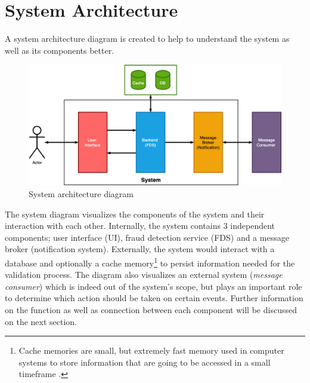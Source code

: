 \section{System Architecture}

A system architecture diagram is created to help to understand the system as well as its components better. 

\begin{figure}[h]
 \includegraphics[width=\textwidth]{diagrams/system.png}
 \caption{System architecture diagram}
\end{figure}
 
The system diagram visualizes the components of the system and their interaction with each other. Internally, the system contains 3 independent components; user interface (UI), fraud detection service (FDS) and a message broker (notification system). 
Externally, the system would interact with a database and optionally a cache memory\footnote{Cache memories are small, but extremely fast memory used in computer systems to store information that are going to be accessed in a small timeframe \autocite{smith-1982}.}  to persist information needed for the validation process. The diagram also visualizes an external system (\emph{message consumer}) which is indeed out of the system's scope, but plays an important role to determine which action should be taken on certain events. Further information on the function as well as connection between each component will be discussed on the next section.